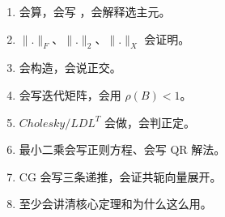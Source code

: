 \documentclass[11pt,a4paper]{ctexart}
\newcommand{\code}[1]{\begingroup\ttfamily\small #1\endgroup}
\begin{document}
\begin{enumerate}

\item \code{} 会算，会写 \code{}，会解释选主元。

\item $\|.\|_F$、$\|.\|_2$、$\|.\|_X$ 会证明。

\item \code{} 会构造，会说正交。

\item \code{} 会写迭代矩阵，会用 $\rho(B)<1$。

\item $Cholesky/LDL^T$ 会做，会判正定。

\item 最小二乘会写正则方程、会写 QR 解法。

\item CG 会写三条递推，会证共轭向量展开。

\item \code{} 至少会讲清核心定理和为什么这么用。

\end{enumerate}
\end{document}
